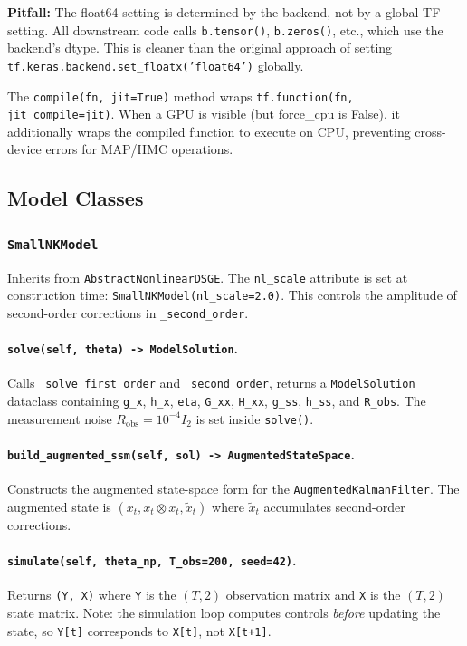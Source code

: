 \documentclass[11pt,a4paper]{article}
\theoremstyle{definition}
\newcommand{\code}[1]{\texttt{\color{codecolor}#1}}
\newcommand{\warn}[1]{\textbf{\color{warncolor}Pitfall:} #1}
\begin{document}
	\warn{The float64 setting is determined by the backend, not by a global TF setting.
		All downstream code calls \code{b.tensor()}, \code{b.zeros()}, etc., which use the backend's dtype.
		This is cleaner than the original approach of setting \code{tf.keras.backend.set\_floatx('float64')} globally.}
	
	The \code{compile(fn, jit=True)} method wraps \code{tf.function(fn, jit\_compile=jit)}.
	When a GPU is visible (but force\_cpu is False), it additionally wraps the compiled function to execute on CPU, preventing cross-device errors for MAP/HMC operations.
	
	\subsection{Model Classes}
	\label{app:dsgeEZ_models}
	
	\subsubsection{\code{SmallNKModel}}
	
	Inherits from \code{AbstractNonlinearDSGE}.
	The \code{nl\_scale} attribute is set at construction time: \code{SmallNKModel(nl\_scale=2.0)}.
	This controls the amplitude of second-order corrections in \code{\_second\_order}.
	
	\paragraph{\code{solve(self, theta) -> ModelSolution}.}
	Calls \code{\_solve\_first\_order} and \code{\_second\_order}, returns a \code{ModelSolution} dataclass containing \code{g\_x}, \code{h\_x}, \code{eta}, \code{G\_xx}, \code{H\_xx}, \code{g\_ss}, \code{h\_ss}, and \code{R\_obs}.
	The measurement noise $R_{\mathrm{obs}} = 10^{-4} I_2$ is set inside \code{solve()}.
	
	\paragraph{\code{build\_augmented\_ssm(self, sol) -> AugmentedStateSpace}.}
	Constructs the augmented state-space form for the \code{AugmentedKalmanFilter}.
	The augmented state is $(x_t, x_t \otimes x_t, \tilde{x}_t)$ where $\tilde{x}_t$ accumulates second-order corrections.
	
	\paragraph{\code{simulate(self, theta\_np, T\_obs=200, seed=42)}.}
	Returns \code{(Y, X)} where \code{Y} is the $(T, 2)$ observation matrix and \code{X} is the $(T, 2)$ state matrix.
	Note: the simulation loop computes controls \emph{before} updating the state, so \code{Y[t]} corresponds to \code{X[t]}, not \code{X[t+1]}.
	
\end{document}
